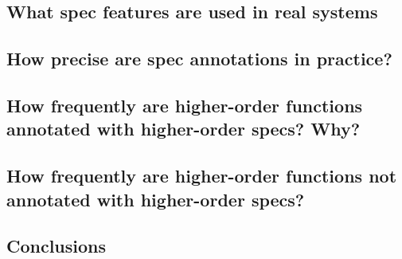\subsection{What spec features are used in real systems}

\subsection{How precise are spec annotations in practice?}

\subsection{How frequently are higher-order functions annotated with higher-order specs? Why?}

\subsection{How frequently are higher-order functions not annotated with higher-order specs?}

\subsection{Conclusions}

